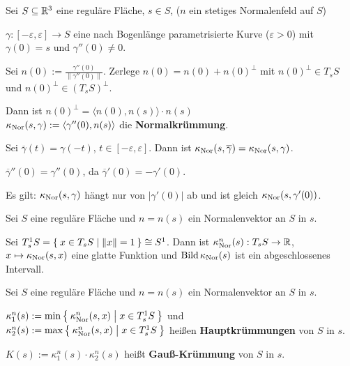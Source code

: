 \begin{definition}\label{def:18.4}%
    Sei $S \subseteq \mathbb{R}^3$ eine reguläre Fläche, $s \in S$, ($n$ ein
    stetiges Normalenfeld auf $S$)

    $\gamma:[-\varepsilon, \varepsilon] \rightarrow S$ eine nach
    Bogenlänge parametrisierte Kurve ($\varepsilon > 0$) mit
    $\gamma(0) = s$ und $\gamma''(0) \neq 0$.

    Sei $n(0) := \frac{\gamma''(0)}{\|\gamma''(0)\|}$. Zerlege
    $n(0) = n(0) + n(0)^\bot$ mit $n(0)^\bot \in T_s S$ und
    $n(0)^\bot \in (T_s S)^\bot$.

    Dann ist $n(0)^\bot = \langle n(0), n(s) \rangle \cdot n(s)$\\
    $\kappa_{\textnormal{Nor}}(s, \gamma) := \langle \gamma''(0), n(s) \rangle$
    die \textbf{Normalkrümmung}.
\end{definition}

\begin{bemerkung}
    Sei $\overline{\gamma}(t) = \gamma(-t)$, $t \in [- \varepsilon, \varepsilon]$.
    Dann ist $\kappa_{\textnormal{Nor}}(s, \overline{\gamma}) = \kappa_{\textnormal{Nor}}(s, \gamma)$.
\end{bemerkung}

\begin{beweis}
    $\overline{\gamma}''(0) = \gamma''(0)$, da $\overline{\gamma}'(0) = - \gamma'(0)$.

    Es gilt: $\kappa_{\textnormal{Nor}}(s,\gamma)$ hängt nur von $|\gamma'(0)|$ ab
    und ist gleich $\kappa_{\textnormal{Nor}}(s, \gamma'(0))$.
\end{beweis}

\begin{bemerkung}%
    Sei $S$ eine reguläre Fläche und $n=n(s)$ ein Normalenvektor an 
    $S$ in $s$.

    Sei $T_{s}^{1} S = \Set{x \in T_s S | \|x\| = 1} \cong S^1$.
    Dann ist $\kappa_{\textnormal{Nor}}^n(s): T_s S \rightarrow \mathbb{R}$,
    $x \mapsto \kappa_{\textnormal{Nor}}(s,x)$ eine glatte Funktion und 
    $\operatorname{Bild} \kappa_{\textnormal{Nor}}(s)$ ist ein abgeschlossenes Intervall.
\end{bemerkung}

\begin{definition}%
    Sei $S$ eine reguläre Fläche und $n=n(s)$ ein Normalenvektor an 
    $S$ in $s$.

    \begin{defenum}
        \item $\kappa^n_1(s) := \min \Set{\kappa_{\textnormal{Nor}}^n(s,x) | x \in T_s^1 S}$ und\\
              $\kappa^n_2(s) := \max \Set{\kappa_{\textnormal{Nor}}^n(s,x) | x \in T_s^1 S}$
              heißen \textbf{Hauptkrümmungen} von $S$ in $s$.
        \item $K(s) := \kappa_1^n(s) \cdot \kappa_2^n(s)$ heißt
              \textbf{Gauß-Krümmung} von $S$ in $s$.
    \end{defenum}
\end{definition}

